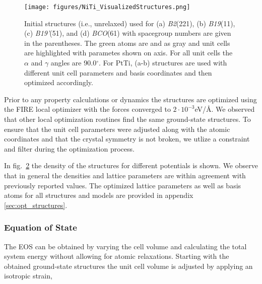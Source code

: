 \documentclass[preprint,colorlinks=true,linkcolor=black,citecolor=black]{elsarticle}
\begin{document}
\begin{figure}[ht!]
    \begin{centering}
        \texttt{[image: figures/NiTi\_VisualizedStructures.png]}
        \caption{
          Initial  structures (i.e., unrelaxed) used for (a) \textit{B2}(221), (b) \textit{B19}(11), (c) \textit{B19'}(51), and (d) \textit{BCO}(61) with spacegroup numbers are given in the parentheses. The green atoms are  and  as gray and unit cells are highlighted with parametes shown on axis. For all unit cells the $\alpha$ and $\gamma$ angles are 90.0$^\circ$. For PtTi, (a-b) structures are used with different unit cell parameters and basis coordinates and then optimized accordingly.
        }
        \label{fig:niti_structures}
    \end{centering}
\end{figure}

Prior to any property calculations or dynamics the structures are optimized using the FIRE\cite{Bitzek2006} local optimizer with the forces converged to $2\cdot 10^{-3}$eV/\AA. We observed that other local optimization routines find the same ground-state structures. To ensure that the unit cell parameters were adjusted along with the atomic coordinates and that the crystal symmetry is not broken, we utlize a constraint and filter during the optimization process. \par

In fig.~\ref{fig:opt_density} the density of the structures for different potentials is shown. We observe that in general the densities and lattice parameters are within agreement with previously reported values. The optimized lattice parameters as well as basis atoms for all structures and models are provided in appendix \ref{sec:opt_structures}. \par

\begin{figure}[ht!]
  \label{fig:opt_density}
  \centering
  \caption{}
\end{figure}


\subsubsection{Equation of State}
The EOS can be obtained by varying the cell volume and calculating the total system energy without allowing for atomic relaxations. Starting with the obtained ground-state structures the unit cell volume is adjusted by applying an isotropic strain,
\end{document}
